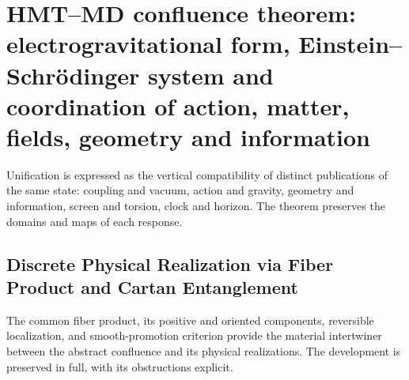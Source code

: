 \chapter{HMT–MD confluence theorem: electrogravitational form, Einstein–Schrödinger system and coordination of action, matter, fields, geometry and information}
\label{chap:parte-iv-51}

Unification is expressed as the vertical compatibility of distinct publications of the same state: coupling and vacuum, action and gravity, geometry and information, screen and torsion, clock and horizon. The theorem preserves the domains and maps of each response.



\section{Discrete Physical Realization via Fiber Product and Cartan Entanglement}

The common fiber product, its positive and oriented components,
reversible localization, and smooth-promotion criterion provide the
material intertwiner between the abstract confluence and its physical
realizations. The development is preserved in full, with its obstructions explicit.

\begingroup
\let\chapter\section
\let\section\subsection
\let\subsection\subsubsection
\let\subsubsection\paragraph
\let\clearpage\relax
\let\cleardoublepage\relax

\endgroup

